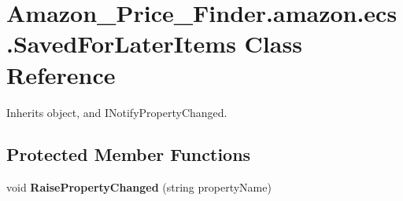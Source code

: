 \hypertarget{class_amazon___price___finder_1_1amazon_1_1ecs_1_1_saved_for_later_items}{\section{Amazon\-\_\-\-Price\-\_\-\-Finder.\-amazon.\-ecs.\-Saved\-For\-Later\-Items Class Reference}
\label{class_amazon___price___finder_1_1amazon_1_1ecs_1_1_saved_for_later_items}
}


 




Inherits object, and I\-Notify\-Property\-Changed.

\subsection*{Protected Member Functions}
\begin{DoxyCompactItemize}
\item 
\hypertarget{class_amazon___price___finder_1_1amazon_1_1ecs_1_1_saved_for_later_items_aa96b4c3b4a9285191ecb38bbd4367370}{void {\bfseries Raise\-Property\-Changed} (string property\-Name)}\label{class_amazon___price___finder_1_1amazon_1_1ecs_1_1_saved_for_later_items_aa96b4c3b4a9285191ecb38bbd4367370}

\end{DoxyCompactItemize}
